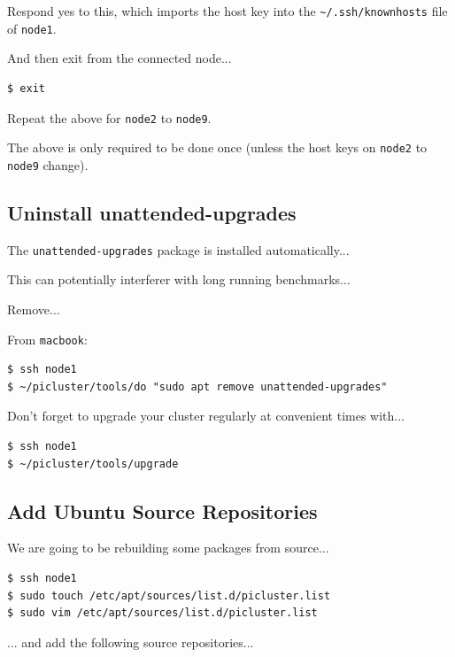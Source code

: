 \documentclass{report}
\begin{document}
Respond yes to this, which imports the host key into the \verb|~/.ssh/knownhosts| file of \verb|node1|.

And then exit from the connected node...

\lstset{style=type}
\begin{lstlisting}[]
$ exit
\end{lstlisting}

Repeat the above for \verb|node2| to \verb|node9|.

The above is only required to be done once (unless the host keys on \verb|node2| to \verb|node9| change).


%
%

\subsection{Uninstall unattended-upgrades}

The \verb|unattended-upgrades| package is installed automatically...

This can potentially interferer with long running benchmarks...

Remove...

From \verb|macbook|:

\lstset{style=type}
\begin{lstlisting}[]
$ ssh node1
$ ~/picluster/tools/do "sudo apt remove unattended-upgrades"
\end{lstlisting}

Don't forget to upgrade your cluster regularly at convenient times with...

\lstset{style=type}
\begin{lstlisting}[]
$ ssh node1
$ ~/picluster/tools/upgrade
\end{lstlisting}


\subsection{Add Ubuntu Source Repositories}

We are going to be rebuilding some packages from source...

\lstset{style=type}
\begin{lstlisting}[]
$ ssh node1
$ sudo touch /etc/apt/sources/list.d/picluster.list
$ sudo vim /etc/apt/sources/list.d/picluster.list
\end{lstlisting}

... and add the following source repositories...
\end{document}
